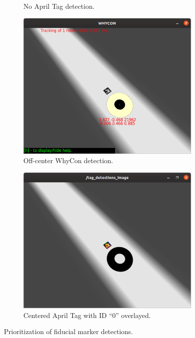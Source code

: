 \begin{figure}
\begin{subfigure}[b]{0.49\textwidth}
         \caption{No April Tag detection.}
         \label{subfig:no_apriltag_detection}
     \end{subfigure}
     \begin{subfigure}[b]{0.49\textwidth}
         \centering
         \includegraphics[width=\textwidth]{images/whycon_off_center.png}
         \caption{Off-center WhyCon detection.}
         \label{subfig:off_center_whycon_detection}
     \end{subfigure}
     \hfill
     \begin{subfigure}[b]{0.49\textwidth}
         \centering
         \includegraphics[width=\textwidth]{images/apriltag_detection.png}
         \caption{Centered April Tag with ID ``0'' overlayed.}
         \label{subfig:centered_april_tag_detection}
     \end{subfigure}
        \caption{Prioritization of fiducial marker detections.}
        \label{fig:detections}
\end{figure}

